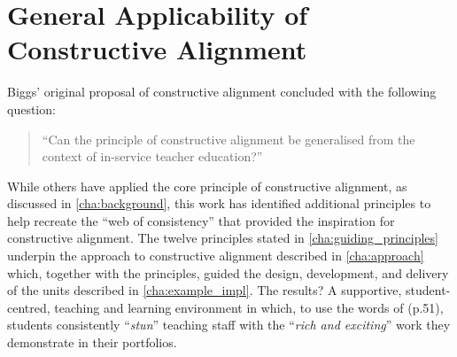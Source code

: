 






\section{General Applicability of Constructive Alignment} %
\label{sec:general_applicability_of_constructive_alignment}

Biggs' original proposal of constructive alignment concluded with the following question:

\begin{quote}
	``Can the principle of constructive alignment be generalised from the context of in-service teacher education?'' \citet{Biggs:1996c}
\end{quote}

While others have applied the core principle of constructive alignment, as discussed in \cref{cha:background}, this work has identified additional principles to help recreate the ``web of consistency'' that provided the inspiration for \citet{Biggs:1996c,Biggs:1999} constructive alignment. The twelve principles stated in \cref{cha:guiding_principles} underpin the approach to constructive alignment described in \cref{cha:approach} which, together with the principles, guided the design, development, and delivery of the units described in \cref{cha:example_impl}. The results? A supportive, student-centred, teaching and learning environment in which, to use the words of \citet{Biggs:2007} (p.51), students consistently ``\emph{stun}'' teaching staff with the ``\emph{rich and exciting}'' work they demonstrate in their portfolios.

